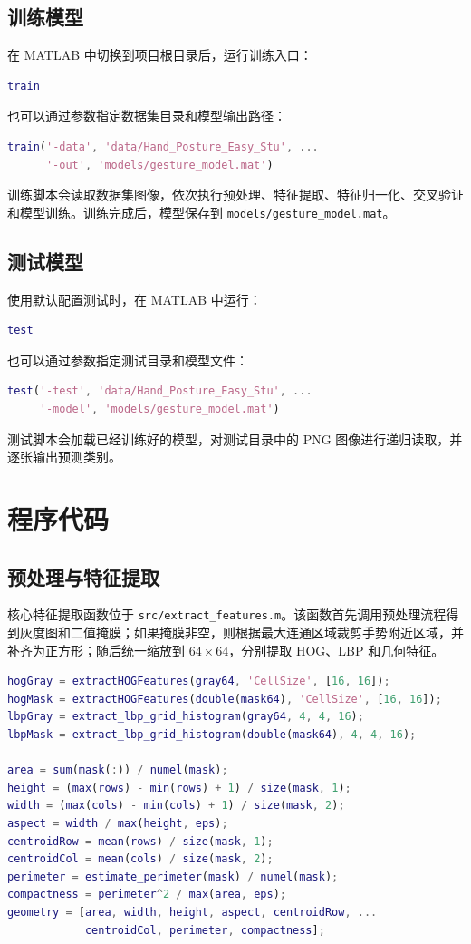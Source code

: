 \documentclass[UTF8,a4paper,10pt]{ctexart}
\begin{document}
\subsection{训练模型}
在 MATLAB 中切换到项目根目录后，运行训练入口：
\begin{lstlisting}[title=训练模型,frame=trbl,language=Matlab]
train
\end{lstlisting}
也可以通过参数指定数据集目录和模型输出路径：
\begin{lstlisting}[title=指定训练路径,frame=trbl,language=Matlab]
train('-data', 'data/Hand_Posture_Easy_Stu', ...
      '-out', 'models/gesture_model.mat')
\end{lstlisting}
训练脚本会读取数据集图像，依次执行预处理、特征提取、特征归一化、交叉验证和模型训练。训练完成后，模型保存到 \texttt{models/gesture\_model.mat}。

\subsection{测试模型}
使用默认配置测试时，在 MATLAB 中运行：
\begin{lstlisting}[title=测试模型,frame=trbl,language=Matlab]
test
\end{lstlisting}
也可以通过参数指定测试目录和模型文件：
\begin{lstlisting}[title=指定测试路径,frame=trbl,language=Matlab]
test('-test', 'data/Hand_Posture_Easy_Stu', ...
     '-model', 'models/gesture_model.mat')
\end{lstlisting}
测试脚本会加载已经训练好的模型，对测试目录中的 PNG 图像进行递归读取，并逐张输出预测类别。

\section{程序代码}
\subsection{预处理与特征提取}
核心特征提取函数位于 \texttt{src/extract\_features.m}。该函数首先调用预处理流程得到灰度图和二值掩膜；如果掩膜非空，则根据最大连通区域裁剪手势附近区域，并补齐为正方形；随后统一缩放到 $64\times64$，分别提取 HOG、LBP 和几何特征。

\begin{lstlisting}[title=特征提取核心代码,frame=trbl,language=Matlab]
hogGray = extractHOGFeatures(gray64, 'CellSize', [16, 16]);
hogMask = extractHOGFeatures(double(mask64), 'CellSize', [16, 16]);
lbpGray = extract_lbp_grid_histogram(gray64, 4, 4, 16);
lbpMask = extract_lbp_grid_histogram(double(mask64), 4, 4, 16);

area = sum(mask(:)) / numel(mask);
height = (max(rows) - min(rows) + 1) / size(mask, 1);
width = (max(cols) - min(cols) + 1) / size(mask, 2);
aspect = width / max(height, eps);
centroidRow = mean(rows) / size(mask, 1);
centroidCol = mean(cols) / size(mask, 2);
perimeter = estimate_perimeter(mask) / numel(mask);
compactness = perimeter^2 / max(area, eps);
geometry = [area, width, height, aspect, centroidRow, ...
            centroidCol, perimeter, compactness];
\end{lstlisting}
\end{document}
